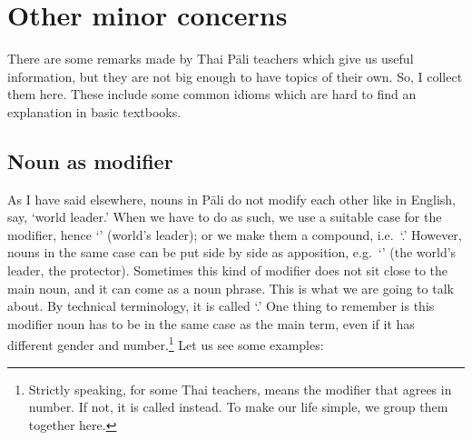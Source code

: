\chapter{Other minor concerns}\label{chap:minors}

There are some remarks made by Thai P\=ali teachers which give us useful information, but they are not big enough to have topics of their own. So, I collect them here. These include some common idioms which are hard to find an explanation in basic textbooks.

{}
\section*{Noun as modifier}

As I have said elsewhere, nouns in P\=ali do not modify each other like in English, say, `world leader.' When we have to do as such, we use a suitable case for the modifier, hence `' (world's leader); or we make them a compound, i.e.\ `.' However, nouns in the same case can be put side by side as apposition, e.g.\ `' (the world's leader, the protector). Sometimes this kind of modifier does not sit close to the main noun, and it can come as a noun phrase. This is what we are going to talk about. By technical terminology, it is called `.' One thing to remember is this modifier noun has to be in the same case as the main term, even if it has different gender and number.\footnote{Strictly speaking, for some Thai teachers,  means the modifier that agrees in number. If not, it is called  instead. To make our life simple, we group them together here.} Let us see some examples:

